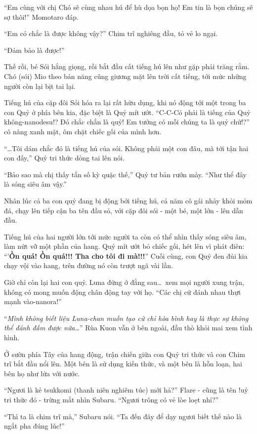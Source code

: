 \documentclass[../main.tex]{subfiles}
\begin{document}
``Em cùng với chị Chó sẽ cùng nhau hú để hù dọa bọn họ! Em tin là bọn chúng sẽ sợ thôi!'' Momotaro đáp.

``Em có chắc là được không vậy?'' Chim trĩ nghiêng đầu, tỏ vẻ lo ngại.

``Đảm bảo là được!''

Thế rồi, bé Sói hắng giọng, rồi bắt đầu cất tiếng hú lên như gặp phải trăng rằm. Chó (sói) Mio theo bản năng cũng giương mặt lên trời cất tiếng, tới mức những người còn lại bịt tai lại.

Tiếng hú của cặp đôi Sói hóa ra lại rất hữu dụng, khi nó động tới một trong ba con Quỷ ở phía bên kia, đặc biệt là Quỷ mít ướt. ``C-C-Có phải là tiếng của Quỷ không-nanodesu!? Đó chắc chắn là quỷ! Em tưởng có mỗi chúng ta là quỷ chứ!?'' cô nàng xanh mặt, ôm chặt chiếc gối của mình hơn.

``\dots Tôi dám chắc đó là tiếng hú của sói. Không phải một con đâu, mà tới tận hai con đấy,'' Quỷ tri thức dỏng tai lên nói.

``Bảo sao mà chị thấy tần số kỳ quặc thế,'' Quỷ tư bản rướn mày. ``Như thể đây là sóng siêu âm vậy.''

Nhân lúc cả ba con quỷ đang bị động bởi tiếng hú, cả năm cô gái nhảy khỏi mỏm đá, chạy lên tiếp cận ba tên đầu sỏ, với cặp đôi sói - một bé, một lớn - lên dẫn đầu.

Tiếng hú của hai người lớn tới mức người ta còn có thể nhìn thấy sóng siêu âm, làm nứt vỡ một phần của hang. Quỷ mít ướt bỏ chiếc gối, hét lên vì phát điên: ``'\textbf{Ồn quá! Ồn quá!!! Tha cho tôi đi mà!!!}'' Cuối cùng, con Quỷ đen đủi kia chạy vội vào hang, trên đường nó còn trượt ngã vài lần.

Giờ chỉ còn lại hai con quỷ. Luna đứng ở đằng sau\dots\ xem mọi người xung trận, không có mong muốn động chân động tay với họ. ``Các chị cứ đánh nhau thựt mạnh vào-nanora!''

``\textit{Mình không biết liệu Luna-chan muốn tạo cử chỉ hòa bình hay là thực sự không thể đánh đấm được nữa\dots}'' Rùa Kuon vẫn ở bên ngoài, đầu thò khỏi mai xem tình hình.

Ở sườn phía Tây của hang động, trận chiến giữa con Quỷ tri thức và con Chim trĩ bắt đầu nổi lên. Một bên là sử dụng kiến thức, và một bên là hỗn loạn, hai bên họ như lửa với nước.

``Ngươi là kẻ tsukkomi (thanh niên nghiêm túc) mới hả?'' Flare - cũng là tên !uỷ tri thức đó - trừng mắt nhìn Subaru. ``Ngươi trông có vẻ lòe loẹt nhỉ?''

``Thì ta là chim trĩ mà,'' Subaru nói. ``Ta đến đây để dạy ngươi biết thế nào là ngắt pha đúng lúc!''
\end{document}

